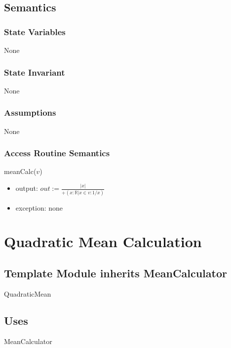 \documentclass[12pt,fleqn]{examtst}
\begin{document}
\subsection* {Semantics}

\subsubsection* {State Variables}

None

\subsubsection* {State Invariant}

None

\subsubsection* {Assumptions}

None

\subsubsection* {Access Routine Semantics}

meanCalc($v$)
\begin{itemize}
\item output: $\mathit{out} := \frac{|x|}{+(x: \mathbb{R} | x \in v : 1/x)}$
\item exception: none
\end{itemize}


\newpage

\section* {Quadratic Mean Calculation}

\subsection*{Template Module inherits MeanCalculator}

QuadraticMean

\subsection* {Uses}

MeanCalculator
\end{document}
